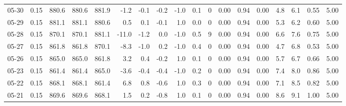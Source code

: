 \begin{threeparttable}
{\begin{tabular}{lrrrrrrrrrrrrrrrrr}
  05-30 &     0.15 & 880.6 & 880.6 & 881.9 &       -1.2 &           -0.1 &                      -0.2 &                     -1.0 &                 0.1 &              0 &       0.00 &      0.94 &           0.00 &              4.8 &                 6.1 &            0.55 &                   5.00 \\
  05-29 &     0.15 & 881.1 & 881.1 & 880.6 &        0.5 &            0.1 &                      -0.1 &                      1.0 &                 0.0 &              0 &       0.00 &      0.94 &           0.00 &              5.3 &                 6.2 &            0.60 &                   5.00 \\
  05-28 &     0.15 & 870.1 & 870.1 & 881.1 &      -11.0 &           -1.2 &                       0.0 &                     -1.0 &                 0.5 &              9 &       0.00 &      0.94 &           0.00 &              6.6 &                 7.6 &            0.75 &                   5.00 \\
  05-27 &     0.15 & 861.8 & 861.8 & 870.1 &       -8.3 &           -1.0 &                       0.2 &                     -1.0 &                 0.4 &              0 &       0.00 &      0.94 &           0.00 &              4.7 &                 6.8 &            0.53 &                   5.00 \\
  05-26 &     0.15 & 865.0 & 865.0 & 861.8 &        3.2 &            0.4 &                      -0.2 &                      1.0 &                 0.1 &              0 &       0.00 &      0.94 &           0.00 &              5.7 &                 6.7 &            0.66 &                   5.00 \\
  05-23 &     0.15 & 861.4 & 861.4 & 865.0 &       -3.6 &           -0.4 &                      -0.4 &                     -1.0 &                 0.2 &              0 &       0.00 &      0.94 &           0.00 &              7.4 &                 8.0 &            0.86 &                   5.00 \\
  05-22 &     0.15 & 868.1 & 868.1 & 861.4 &        6.8 &            0.8 &                      -0.6 &                      1.0 &                 0.3 &              0 &       0.00 &      0.94 &           0.00 &              7.1 &                 8.5 &            0.82 &                   5.00 \\
  05-21 &     0.15 & 869.6 & 869.6 & 868.1 &        1.5 &            0.2 &                      -0.8 &                      1.0 &                 0.1 &              0 &       0.00 &      0.94 &           0.00 &              8.6 &                 9.1 &            1.00 &                   5.00 \\

\end{tabular}}
\end{threeparttable}
